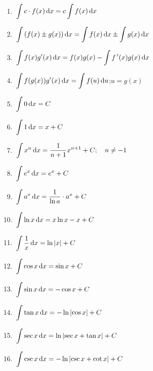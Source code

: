 \newcommand{\intRuleStrut}{\bgroup\SuspendTagging{mystrut76}\vphantom{\dfrac1{\sqrt{x^2}}}\egroup}%
\noindent{}%
\hspace{-1.5em}%
\parbox[t]{.37\linewidth}{%
\begin{enumerate}
\item $\intRuleStrut\ds\int c\cdot f(x)\dd x=c\int f(x)\dd x$
\item $\intRuleStrut\ds\int\left(f(x)\pm g(x)\right)\dd x=\int f(x)\dd x\pm\int g(x)\dd x$
\item $\intRuleStrut\ds\int f(x)g'(x)\dd x=f(x)g(x)-\int\fp(x)g(x)\dd x$
\item $\intRuleStrut\ds\int f(g(x))g'(x)\dd x=\int f(u)\dd u$;\quad $u=g(x)$
\item $\intRuleStrut\ds\int0\dd x=C$
\item $\intRuleStrut\ds\int1\dd x=x+C$
\item $\intRuleStrut\ds\int x^n\dd x=\frac1{n+1}x^{n+1}+C;\quad n\ne-1$
\item $\intRuleStrut\ds\int e^x\dd x=e^x+C$
\item $\intRuleStrut\ds\int a^x\dd x=\frac1{\ln a}\cdot a^x+C$
\item $\intRuleStrut\ds\int\ln x\dd x=x\ln x-x+C$
\item $\intRuleStrut\ds\int\frac1x\dd x=\ln \abs{x} + C$
\item $\intRuleStrut\ds\int\cos x\dd x=\sin x+C$
\item $\intRuleStrut\ds\int\sin x\dd x=-\cos x+C$
\item $\intRuleStrut\ds\int\tan x\dd x=-\ln \abs{\cos x}+C$
\item $\intRuleStrut\ds\int\sec x\dd x=\ln \abs{\sec x+\tan x}+C$
\item $\intRuleStrut\ds\int\csc x\dd x=-\ln \abs{\csc x+\cot x}+C$
\end{enumerate}}%
\hfill
